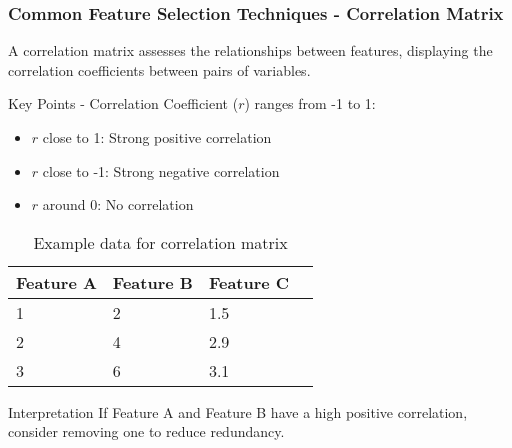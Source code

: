 \documentclass[aspectratio=169]{beamer}
\begin{document}
\begin{frame}[fragile]
    \frametitle{Common Feature Selection Techniques - Correlation Matrix}
    A correlation matrix assesses the relationships between features, displaying the correlation coefficients between pairs of variables.

    \begin{block}{Key Points}
        - Correlation Coefficient ($r$) ranges from -1 to 1:
            \begin{itemize}
                \item $r$ close to 1: Strong positive correlation
                \item $r$ close to -1: Strong negative correlation
                \item $r$ around 0: No correlation
            \end{itemize}
    \end{block}

    \begin{table}[ht]
        \centering
        \begin{tabular}{|l|l|l|l|}
            \hline
            Feature A & Feature B & Feature C \\ \hline
            1 & 2 & 1.5 \\ \hline
            2 & 4 & 2.9 \\ \hline
            3 & 6 & 3.1 \\ \hline
        \end{tabular}
        \caption{Example data for correlation matrix}
    \end{table}

    \begin{block}{Interpretation}
        If Feature A and Feature B have a high positive correlation, consider removing one to reduce redundancy.
    \end{block}
\end{frame}
\end{document}
